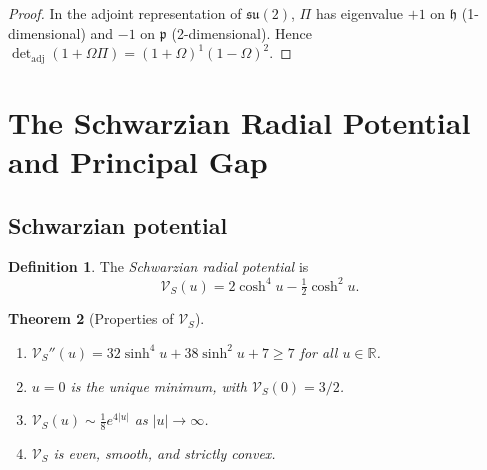 \documentclass[12pt]{article}
\theoremstyle{plain}
\newtheorem{theorem}{Theorem}[section]
\theoremstyle{definition}
\newtheorem{definition}[theorem]{Definition}
\numberwithin{equation}{section}
\newcommand{\R}{\mathbb{R}}
\newcommand{\fh}{\mathfrak{h}}
\newcommand{\fp}{\mathfrak{p}}
\begin{document}
\begin{proof}
In the adjoint representation of $\mathfrak{su}(2)$, $\Pi$ has eigenvalue $+1$ on $\fh$ (1-dimensional) and $-1$ on $\fp$ (2-dimensional).  Hence $\det_{\mathrm{adj}}(1+\Omega\Pi)=(1+\Omega)^1(1-\Omega)^2$.
\end{proof}

\section{The Schwarzian Radial Potential and Principal Gap}\label{sec:principalgap}

\subsection{Schwarzian potential}

\begin{definition}
The \emph{Schwarzian radial potential} is
\begin{equation}
\mathcal{V}_S(u) = 2\cosh^4 u - \tfrac{1}{2}\cosh^2 u.
\end{equation}
\end{definition}

\begin{theorem}[Properties of $\mathcal{V}_S$]\label{thm:VSprops}
\begin{enumerate}[label=(\roman*)]
\item $\mathcal{V}_S''(u) = 32\sinh^4 u + 38\sinh^2 u + 7 \geq 7$ for all $u\in\R$.
\item $u=0$ is the unique minimum, with $\mathcal{V}_S(0)=3/2$.
\item $\mathcal{V}_S(u)\sim\frac{1}{8}e^{4|u|}$ as $|u|\to\infty$.
\item $\mathcal{V}_S$ is even, smooth, and strictly convex.
\end{enumerate}
\end{theorem}
\end{document}
